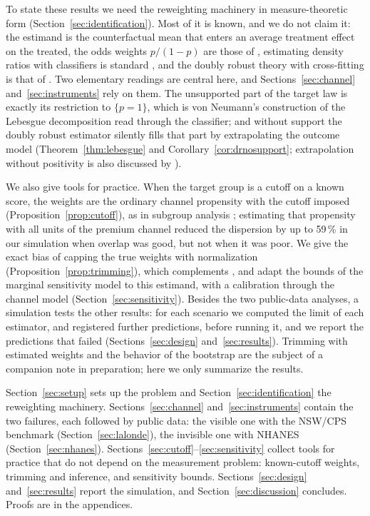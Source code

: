 \documentclass[twoside,11pt]{article}
\theoremstyle{plain}
\theoremstyle{definition}
\begin{document}
To state these results we need the reweighting machinery in measure-theoretic form (Section~\ref{sec:identification}). Most of it is known, and we do not claim it: the estimand is the counterfactual mean that enters an average treatment effect on the treated, the odds weights $p/(1-p)$ are those of \citet{hirano2003}, estimating density ratios with classifiers is standard \citep{bickel2009,qin1998,sugiyama2012}, and the doubly robust theory with cross-fitting is that of \citet{chernozhukov2018}. Two elementary readings are central here, and Sections~\ref{sec:channel} and~\ref{sec:instruments} rely on them. The unsupported part of the target law is exactly its restriction to $\{p=1\}$, which is von Neumann's construction of the Lebesgue decomposition \citep[Theorem 6.10]{rudin1987} read through the classifier; and without support the doubly robust estimator silently fills that part by extrapolating the outcome model (Theorem~\ref{thm:lebesgue} and Corollary~\ref{cor:drnosupport}; extrapolation without positivity is also discussed by \citet{petersen2012}).

We also give tools for practice. When the target group is a cutoff on a known score, the weights are the ordinary channel propensity with the cutoff imposed (Proposition~\ref{prop:cutoff}), as in subgroup analysis \citep{rassen2012}; estimating that propensity with all units of the premium channel reduced the dispersion by up to 59\,\% in our simulation when overlap was good, but not when it was poor. We give the exact bias of capping the true weights with normalization (Proposition~\ref{prop:trimming}), which complements \citet{ma2020}, and adapt the bounds of the marginal sensitivity model \citep{dorn2023,tan2006} to this estimand, with a calibration through the channel model (Section~\ref{sec:sensitivity}). Besides the two public-data analyses, a simulation tests the other results: for each scenario we computed the limit of each estimator, and registered further predictions, before running it, and we report the predictions that failed (Sections~\ref{sec:design} and~\ref{sec:results}). Trimming with estimated weights and the behavior of the bootstrap are the subject of a companion note in preparation; here we only summarize the results.

Section~\ref{sec:setup} sets up the problem and Section~\ref{sec:identification} the reweighting machinery. Sections~\ref{sec:channel} and~\ref{sec:instruments} contain the two failures, each followed by public data: the visible one with the NSW/CPS benchmark (Section~\ref{sec:lalonde}), the invisible one with NHANES (Section~\ref{sec:nhanes}). Sections~\ref{sec:cutoff}--\ref{sec:sensitivity} collect tools for practice that do not depend on the measurement problem: known-cutoff weights, trimming and inference, and sensitivity bounds. Sections~\ref{sec:design} and~\ref{sec:results} report the simulation, and Section~\ref{sec:discussion} concludes. Proofs are in the appendices.
\end{document}
